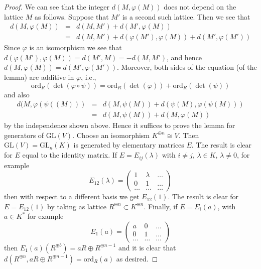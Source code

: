 \documentclass[10pt,a4paper]{amsart}
\theoremstyle{plain}
\theoremstyle{definition}
\theoremstyle{remark}
\numberwithin{equation}{subsection}
\begin{document}
\begin{proof}
We can see that the integer $d(M, \varphi(M))$ does not depend
on the lattice $M$ as follows. Suppose that $M'$ is a second such
lattice. Then we see that
\begin{eqnarray*}
d(M, \varphi(M)) & = & d(M, M') + d(M', \varphi(M)) \\
& = & d(M, M') + d(\varphi(M'), \varphi(M)) + d(M', \varphi(M'))
\end{eqnarray*}
Since $\varphi$ is an isomorphism we see that
$d(\varphi(M'), \varphi(M)) = d(M', M) = -d(M, M')$, and hence
$d(M, \varphi(M)) = d(M', \varphi(M'))$. Moreover, both sides of the
equation (of the lemma) are additive in $\varphi$, i.e.,
$$
\text{ord}_R(\det(\varphi \circ \psi))
=
\text{ord}_R(\det(\varphi))
+
\text{ord}_R(\det(\psi))
$$
and also
\begin{eqnarray*}
d(M, \varphi(\psi((M))) & = &
d(M, \psi(M)) + d(\psi(M), \varphi(\psi(M))) \\
& = & d(M, \psi(M)) + d(M, \varphi(M))
\end{eqnarray*}
by the independence shown above. Hence it suffices to prove the lemma
for generators of $\text{GL}(V)$. Choose an isomorphism
$K^{\oplus n} \cong V$. Then $\text{GL}(V) = \text{GL}_n(K)$ is
generated by elementary matrices $E$.
The result is clear for $E$ equal to the identity matrix.
If $E = E_{ij}(\lambda)$ with $i \not = j$, $\lambda \in K$,
$\lambda \not = 0$, for example
$$
E_{12}(\lambda) =
\left(
\begin{matrix}
1 & \lambda & \ldots \\
0 & 1 & \ldots \\
\ldots & \ldots & \ldots
\end{matrix}
\right)
$$
then with respect to a different basis we get $E_{12}(1)$.
The result is clear for $E = E_{12}(1)$ by taking as lattice
$R^{\oplus n} \subset K^{\oplus n}$. Finally, if $E = E_i(a)$,
with $a \in K^*$ for example
$$
E_1(a) =
\left(
\begin{matrix}
a & 0 & \ldots \\
0 & 1 & \ldots \\
\ldots & \ldots & \ldots
\end{matrix}
\right)
$$
then $E_1(a)(R^{\oplus b}) = aR \oplus R^{\oplus n - 1}$ and
it is clear that $d(R^{\oplus n}, aR \oplus R^{\oplus n - 1})
= \text{ord}_R(a)$ as desired.
\end{proof}
\end{document}
